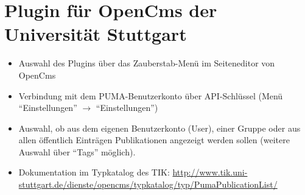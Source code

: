 \section{Plugin für OpenCms der Universität Stuttgart}
\label{sec:pluginOpencms}
\begin{itemize}
\item Auswahl des Plugins über das Zauberstab-Menü im Seiteneditor von OpenCms
\item Verbindung mit dem PUMA-Benutzerkonto über API-Schlüssel (\mbox{Menü} \enquote{Einstellungen} $\to$ \enquote{Einstellungen})
\item Auswahl, ob aus dem eigenen Benutzerkonto (User), einer Gruppe oder aus allen öffentlich Einträgen Publikationen angezeigt werden sollen (weitere Auswahl über \enquote{Tags} möglich).
\item Dokumentation im Typkatalog des TIK: \newline \url{http://www.tik.uni-stuttgart.de/dienste/opencms/typkatalog/typ/PumaPublicationList/}
\end{itemize} 
